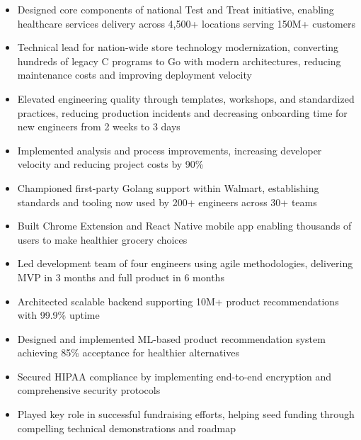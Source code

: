 \documentclass[10pt,a4paper,ragged2e,withhyper]{altacv}
\begin{document}
\begin{paracol}{2}

  \begin{itemize}
      \item Designed core components of national Test and Treat initiative, enabling healthcare services delivery across 4,500+ locations serving 150M+ customers
      \item Technical lead for nation-wide store technology modernization, converting hundreds of legacy C programs to Go with modern architectures, reducing maintenance costs and improving deployment velocity
      \item Elevated engineering quality through templates, workshops, and standardized practices, reducing production incidents and decreasing onboarding time for new engineers from 2 weeks to 3 days
      \item Implemented analysis and process improvements, increasing developer velocity and reducing project costs by 90\%
      \item Championed first-party Golang support within Walmart, establishing standards and tooling now used by 200+ engineers across 30+ teams
  \end{itemize}
  
  \divider

  \begin{itemize}
    \item Built Chrome Extension and React Native mobile app enabling thousands of users to make healthier grocery choices
    \item Led development team of four engineers using agile methodologies, delivering MVP in 3 months and full product in 6 months
    \item Architected scalable backend supporting 10M+ product recommendations with 99.9\% uptime
    \item Designed and implemented ML-based product recommendation system achieving 85\% acceptance for healthier alternatives
    \item Secured HIPAA compliance by implementing end-to-end encryption and comprehensive security protocols
    \item Played key role in successful fundraising efforts, helping seed funding through compelling technical demonstrations and roadmap
  \end{itemize}
  

\end{paracol}
\end{document}

